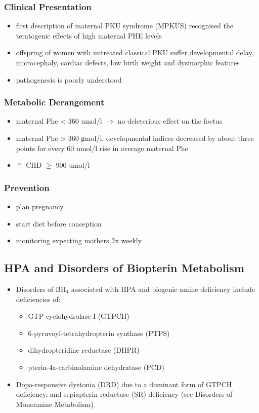 \documentclass{scrartcl}
\begin{document}
\subsubsection{Clinical Presentation}
\label{sec:org078f586}
\begin{itemize}
\item first description of maternal PKU syndrome (MPKUS) recognised the
teratogenic effects of high maternal PHE levels
\item offspring of women with untreated classical PKU suffer developmental
delay, microcephaly, cardiac defects, low birth weight and
dysmorphic features
\item pathogenesis is poorly understood
\end{itemize}
\subsubsection{Metabolic Derangement}
\label{sec:org13dca89}
\begin{itemize}
\item maternal Phe \textless{} 360 umol/l \(\to\) no deleterious effect on the foetus
\item maternal Phe \textgreater{} 360 μmol/l, developmental indices decreased by
about three points for every 60 umol/l rise in average maternal Phe
\item \(\uparrow\) CHD \(\ge\) 900 umol/l
\end{itemize}
\subsubsection{Prevention}
\label{sec:orgb29166b}
\begin{itemize}
\item plan pregnancy
\item start diet before conception
\item monitoring expecting mothers 2x weekly
\end{itemize}

\subsection{HPA and Disorders of Biopterin Metabolism}
\label{sec:org7247351}
\begin{itemize}
\item Disorders of BH\(_{\text{4}}\) associated with HPA and biogenic amine deficiency
include deficiencies of:
\begin{itemize}
\item GTP cyclohydrolase I (GTPCH)
\item 6-pyruvoyl-tetrahydropterin synthase (PTPS)
\item dihydropteridine reductase (DHPR)
\item pterin-4a-carbinolamine dehydratase (PCD)
\end{itemize}
\item Dopa-responsive dystonia (DRD) due to a dominant form of GTPCH
deficiency, and sepiapterin reductase (SR) deficiency (see Disorders of Monoamine Metabolism)
\end{itemize}
\end{document}
